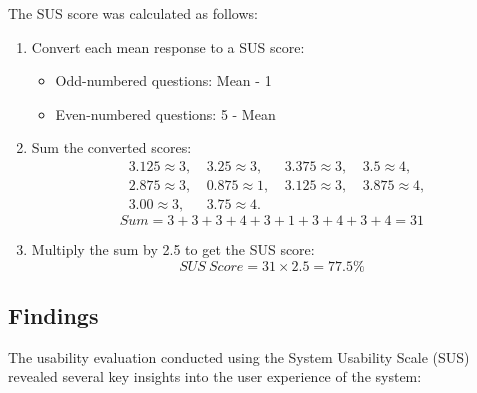 \documentclass[conference]{IEEEtran}
\begin{document}
    The SUS score was calculated as follows:
    \begin{enumerate}
        \item Convert each mean response to a SUS score:
        \begin{itemize}
            \item Odd-numbered questions: Mean - 1
            \item Even-numbered questions: 5 - Mean
        \end{itemize}
        \item Sum the converted scores:
        \begin{align}
            &3.125 \approx 3,& \ 3.25 \approx 3,& \ 3.375 \approx 3,& \ 3.5 \approx 4, \nonumber \\
            &2.875 \approx 3,& \ 0.875 \approx 1,& \ 3.125 \approx 3,& \ 3.875 \approx 4, \nonumber \\
            &3.00 \approx 3,& \ 3.75 \approx 4. \nonumber
        \end{align}
        \begin{equation}
            Sum = 3 + 3 + 3 + 4 + 3 + 1 + 3 + 4 + 3 + 4 = 31
        \end{equation}
        \item Multiply the sum by 2.5 to get the SUS score:
        \begin{equation}
            SUS\ Score = 31 \times 2.5 = 77.5\%
        \end{equation}
    \end{enumerate}
    \subsection{Findings}

    The usability evaluation conducted using the System Usability Scale (SUS) revealed several key insights into the user experience of the system:
    
\end{document}
